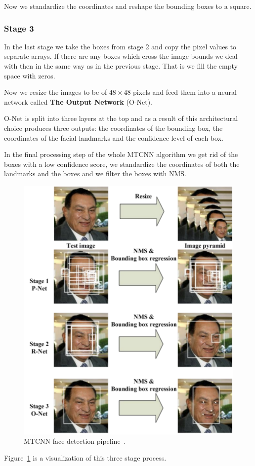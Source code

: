 Now we standardize the coordinates and reshape the bounding boxes to a square.

\subsubsection{Stage 3}
In the last stage we take the boxes from stage 2 and copy the pixel values to separate arrays.
If there are any boxes which cross the image bounds we deal with then in the same way as in the previous stage.
That is we fill the empty space with zeros.

Now we resize the images to be of $48 \times 48$ pixels and feed them into a neural network called
\textbf{The Output Network} (O-Net).

O-Net is split into three layers at the top and as a result of this architectural choice produces three outputs:
the coordinates of the bounding box, the coordinates of the facial landmarks and the confidence level of each box.

In the final processing step of the whole MTCNN algorithm we get rid of the boxes with a low confidence score,
we standardize the coordinates of both the landmarks and the boxes and  we filter the boxes with NMS.

\begin{figure}[H]
    \centering
    \includegraphics[width=0.7\columnwidth]{images/face-recognition/mtcnn.png}
    \caption{MTCNN face detection pipeline~\cite{MTCNN}.}
    \label{fig:mtcnn}
\end{figure}

Figure~\ref{fig:mtcnn} is a visualization of this three stage process.